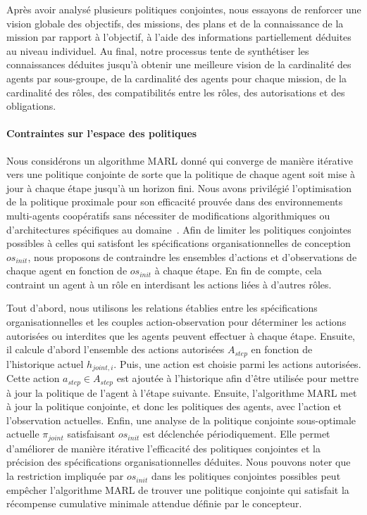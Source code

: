 Après avoir analysé plusieurs politiques conjointes, nous essayons de renforcer une vision globale des objectifs, des missions, des plans et de la connaissance de la mission par rapport à l'objectif, à l'aide des informations partiellement déduites au niveau individuel.
Au final, notre processus tente de synthétiser les connaissances déduites jusqu'à obtenir une meilleure vision de la cardinalité des agents par sous-groupe, de la cardinalité des agents pour chaque mission, de la cardinalité des rôles, des compatibilités entre les rôles, des autorisations et des obligations.

\paragraph{\textbf{Contraintes sur l'espace des politiques}}

Nous considérons un algorithme MARL donné qui converge de manière itérative vers une politique conjointe de sorte que la politique de chaque agent soit mise à jour à chaque étape jusqu'à un horizon fini.
Nous avons privilégié l'optimisation de la politique proximale pour son efficacité prouvée dans des environnements multi-agents coopératifs sans nécessiter de modifications algorithmiques ou d'architectures spécifiques au domaine~\cite{Yu2022}.
Afin de limiter les politiques conjointes possibles à celles qui satisfont les spécifications organisationnelles de conception $os_{init}$, nous proposons de contraindre les ensembles d'actions et d'observations de chaque agent en fonction de $os_{init}$ à chaque étape. En fin de compte, cela contraint un agent à un rôle en interdisant les actions liées à d'autres rôles.

Tout d'abord, nous utilisons les relations établies entre les spécifications organisationnelles et les couples action-observation pour déterminer les actions autorisées ou interdites que les agents peuvent effectuer à chaque étape.
Ensuite, il calcule d'abord l'ensemble des actions autorisées $A_{step}$ en fonction de l'historique actuel $h_{joint,i}$. Puis, une action est choisie parmi les actions autorisées. Cette action $a_{step} \in A_{step}$ est ajoutée à l'historique afin d'être utilisée pour mettre à jour la politique de l'agent à l'étape suivante. Ensuite, l'algorithme MARL met à jour la politique conjointe, et donc les politiques des agents, avec l'action et l'observation actuelles.
Enfin, une analyse de la politique conjointe sous-optimale actuelle $\pi_{joint}$ satisfaisant $os_{init}$ est déclenchée périodiquement. Elle permet d'améliorer de manière itérative l'efficacité des politiques conjointes et la précision des spécifications organisationnelles déduites.
Nous pouvons noter que la restriction impliquée par $os_{init}$ dans les politiques conjointes possibles peut empêcher l'algorithme MARL de trouver une politique conjointe qui satisfait la récompense cumulative minimale attendue définie par le concepteur.

